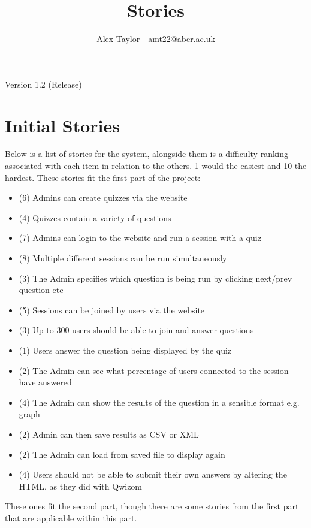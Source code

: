 \documentclass{article}
\title{Stories}
\author{Alex Taylor - amt22@aber.ac.uk}
\begin{document}
\maketitle
\begin{center}
	Version 1.2 (Release)
\end{center}
\thispagestyle{empty}

\section{Initial Stories}
Below is a list of stories for the system, alongside them is a difficulty ranking associated with each item in relation to the others. 1 would the easiest and 10 the hardest.
These stories fit the first part of the project:
\begin{itemize}
	\item (6) Admins can create quizzes via the website
	\item (4) Quizzes contain a variety of questions
	\item (7) Admins can login to the website and run a session with a quiz
	\item (8) Multiple different sessions can be run simultaneously
	\item (3) The Admin specifies which question is being run by clicking next/prev question etc
	\item (5) Sessions can be joined by users via the website
	\item (3) Up to 300 users should be able to join and answer questions
	\item (1) Users answer the question being displayed by the quiz
	\item (2) The Admin can see what percentage of users connected to the session have answered
	\item (4) The Admin can show the results of the question in a sensible format e.g. graph
	\item (2) Admin can then save results as CSV or XML
	\item (2) The Admin can load from saved file to display again
	\item (4) Users should not be able to submit their own answers by altering the HTML, as they did with Qwizom
\end{itemize}
These ones fit the second part, though there are some stories from the first part that are applicable within this part.
\end{document}
